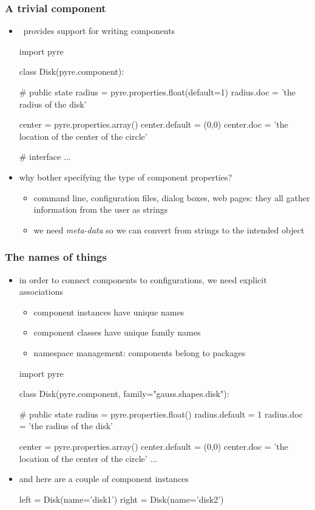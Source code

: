 \begin{frame}[fragile]
%
  \frametitle{A trivial component}
%
  \begin{itemize}
%
  \item \pyre\ provides support for writing components
%
    \begin{ipython}{}
import pyre

class Disk(pyre.component):

    # public state
    radius = pyre.properties.float(default=1)
    radius.doc = 'the radius of the disk'

    center = pyre.properties.array()
    center.default = (0,0)
    center.doc = 'the location of the center of the circle'

    # interface
    ...
    \end{ipython}
%
  \item why bother specifying the type of component properties?
    \begin{itemize}
    \item command line, configuration files, dialog boxes, web pages: they all gather
      information from the user as strings
    \item we need \emph{meta-data} so we can convert from strings to the intended object
    \end{itemize}
%
  \end{itemize}
%
\end{frame}

\begin{frame}[fragile]
%
  \frametitle{The names of things}
%
  \begin{itemize}
  \item in order to connect components to configurations, we need explicit associations
    \begin{itemize}
    \item component instances have unique names
    \item component classes have unique family names
    \item namespace management: components belong to packages
    \end{itemize}
%
    \begin{ipython}{}
import pyre

class Disk(pyre.component, family="gauss.shapes.disk"):

    # public state
    radius = pyre.properties.float()
    radius.default = 1
    radius.doc = 'the radius of the disk'

    center = pyre.properties.array()
    center.default = (0,0)
    center.doc = 'the location of the center of the circle'
    ...
    \end{ipython}
%
  \item and here are a couple of component instances
%
    \begin{ipython}{}
left = Disk(name='disk1')
right = Disk(name='disk2')
    \end{ipython}
%
    \end{itemize}
%
\end{frame}

